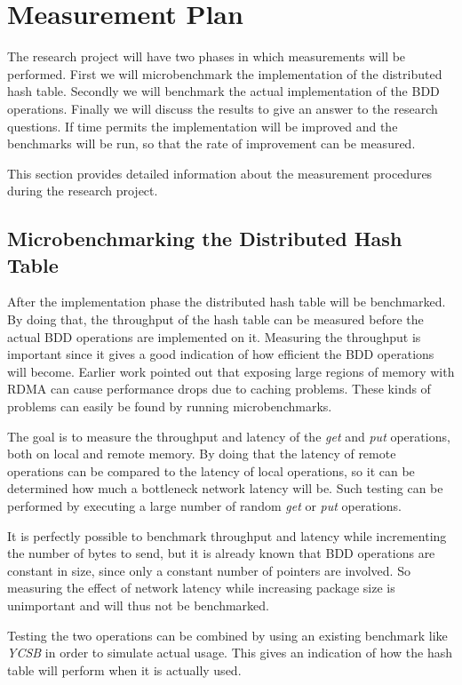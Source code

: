 \chapter{Measurement Plan}

The research project will have two phases in which measurements will be performed. First we will microbenchmark the implementation of the distributed hash table. Secondly we will benchmark the actual implementation of the BDD operations. Finally we will discuss the results to give an answer to the research questions. If time permits the implementation will be improved and the benchmarks will be run, so that the rate of improvement can be measured. 

This section provides detailed information about the measurement procedures during the research project.

\section{Microbenchmarking the Distributed Hash Table}
After the implementation phase the distributed hash table will be benchmarked. By doing that, the throughput of the hash table can be measured before the actual BDD operations are implemented on it. Measuring the throughput is important since it gives a good indication of how efficient the BDD operations will become. Earlier work pointed out that exposing large regions of memory with RDMA can cause performance drops due to caching problems. These kinds of problems can easily be found by running microbenchmarks.

The goal is to measure the throughput and latency of the \textit{get} and \textit{put} operations, both on local and remote memory. By doing that the latency of remote operations can be compared to the latency of local operations, so it can be determined how much a bottleneck network latency will be. Such testing can be performed by executing a large number of random \textit{get} or \textit{put} operations. 

It is perfectly possible to benchmark throughput and latency while incrementing the number of bytes to send, but it is already known that BDD operations are constant in size, since only a constant number of pointers are involved. So measuring the effect of network latency while increasing package size is unimportant and will thus not be benchmarked.

Testing the two operations can be combined by using an existing benchmark like \emph{YCSB} in order to simulate actual usage. This gives an indication of how the hash table will perform when it is actually used.

